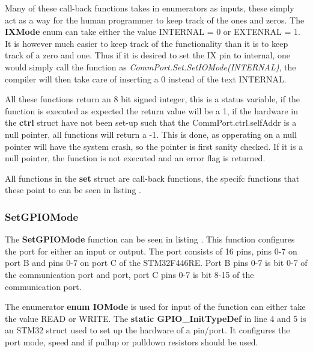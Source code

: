 Many of these call-back functions takes in enumerators as inputs, these simply act as a way for the human programmer to keep track of the ones and zeros. The \textbf{IXMode} enum can take either the value INTERNAL = 0 or EXTENRAL = 1. It is however much easier to keep track of the functionality than it is to keep track of a zero and one. Thus if it is desired to set the IX pin to internal, one would simply call the function as \textit{CommPort.Set.SetIOMode(INTERNAL)}, the compiler will then take care of inserting a 0 instead of the text INTERNAL. 

All these functions return an 8 bit signed integer, this is a status variable, if the function is executed as expected the return value will be a 1, if the hardware in the \textbf{ctrl} struct have not been set-up such that the CommPort.ctrl.selfAddr is a null pointer, all functions will return a -1. This is done, as opperating on a null pointer will have the system crash, so the pointer is first sanity checked. If it is a null pointer, the function is not executed and an error flag is returned.

All functions in the \textbf{set} struct are call-back functions, the specifc functions that these point to can be seen in listing .


\subsubsection*{SetGPIOMode}
The \textbf{SetGPIOMode} function can be seen in listing . This function configures the port for either an input or output. The port consists of 16 pins, pins 0-7 on port B and pins 0-7 on port C of the STM32F446RE. Port B pins 0-7 is bit 0-7 of the communication port and port, port C pins 0-7 is bit 8-15 of the communication port.


The enumerator \textbf{enum IOMode} is used for input of the function can either take the value READ or WRITE. The \textbf{static GPIO\_InitTypeDef} in line 4 and 5 is an STM32 struct used to set up the hardware of a pin/port. It configures the port mode, speed and if pullup or pulldown resistors should be used.

